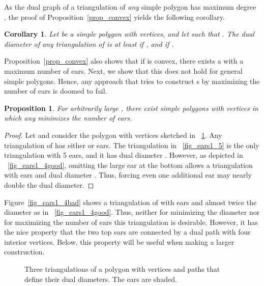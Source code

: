 \documentclass{article}
\newtheorem{prop}[theorem]{Proposition}
\newtheorem{cor}[theorem]{Corollary}
\begin{document}
As the dual graph of a triangulation of \emph{any} simple polygon has 
maximum degree , the proof of Proposition~\ref{prop_convex}
yields the following corollary.
\begin{cor}\label{cor_lb}
Let  be a simple polygon with  vertices, and let
 such that
. 
The dual diameter of 
any triangulation of  is at least 
 if
,
and 
 if 
. 
\end{cor}

Proposition~\ref{prop_convex} also shows that if  is convex, 
there exists a  with a maximum number of ears. 
Next, we show that this does not hold for general simple polygons.
Hence, any approach that tries to construct s by maximizing the 
number of ears is doomed to fail.

\begin{prop}\label{prop_leaves}
For arbitrarily large , there
exist simple polygons with  vertices in which any  minimizes the 
number of ears. 
\end{prop}
\begin{proof}
Let  and consider the polygon  with  vertices 
sketched in \figurename~\ref{fig_ears1}.
Any triangulation of  has either  or  ears.
The triangulation in \figurename~\ref{fig_ears1_5} is the only 
triangulation with 5 ears, and it has dual diameter .
However, as depicted in \figurename~\ref{fig_ears1_4good}, omitting the 
large ear at the bottom allows a triangulation with  ears and dual 
diameter .
Thus, forcing even one additional ear may nearly double the dual diameter. 
\end{proof}

Figure~\ref{fig_ears1_4bad} shows a triangulation
of  with  ears and almost twice the 
diameter as in \figurename~\ref{fig_ears1_4good}. Thus, neither for 
minimizing the diameter nor for maximizing the number of ears this 
triangulation is desirable. 
However, it has the nice property that the 
two top ears are connected by a dual path with four interior vertices.
Below, this property will be useful when making a larger construction.

\begin{figure}[htb]
\centering
{}\hspace{0.4cm}
\hspace{0.4cm}
\caption{Three triangulations of a polygon with  vertices 
   and paths that define their dual diameters.
  The ears are shaded.}
\label{fig_ears1}
\end{figure}
\end{document}

